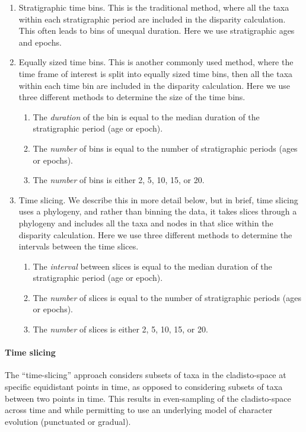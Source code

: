 \documentclass[12pt,a4paper]{article}
\begin{document}
\begin{enumerate}
  \item Stratigraphic time bins. This is the traditional method, where all the taxa within each stratigraphic period are included in the disparity calculation. This often leads to bins of unequal duration. Here we use stratigraphic ages and epochs.
  \item Equally sized time bins. This is another commonly used method, where the time frame of interest is split into equally sized time bins, then all the taxa within each time bin are included in the disparity calculation. Here we use three different methods to determine the size of the time bins. 
    \begin{enumerate}
      \item The \textit{duration} of the bin is equal to the median duration of the stratigraphic period (age or epoch).
      \item The \textit{number} of bins is equal to the number of stratigraphic periods (ages or epochs).
      \item The \textit{number} of bins is either 2, 5, 10, 15, or 20.
    \end{enumerate}
  \item Time slicing. We describe this in more detail below, but in brief, time slicing uses a phylogeny, and rather than binning the data, it takes slices through a phylogeny and includes all the taxa and nodes in that slice within the disparity calculation. Here we use three different methods to determine the intervals between the time slices.
    \begin{enumerate}
      \item The \textit{interval} between slices is equal to the median duration of the stratigraphic period (age or epoch).
      \item The \textit{number} of slices is equal to the number of stratigraphic periods (ages or epochs).
      \item The \textit{number} of slices is either 2, 5, 10, 15, or 20.
    \end{enumerate}  

\end{enumerate}

\paragraph{Time slicing} 
\label{time_slicing}
The ``time-slicing'' approach considers subsets of taxa in the cladisto-space at specific equidistant points in time, as opposed to considering subsets of taxa between two points in time.
This results in even-sampling of the cladisto-space across time and while permitting to use an underlying model of character evolution (punctuated or gradual). 
\end{document}
